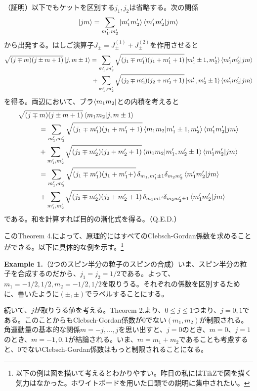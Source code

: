 \documentclass[dvipdfmx]{jarticle}
\theoremstyle{plain}
\begin{document}
\begin{enumerate}
        （証明）以下でもケットを区別する$j_1, j_2$は省略する。次の関係
        \begin{align}
          \ket{jm} = \sum_{m'_1,m'_2} \ket{m'_1m'_2}\bra{m'_1m'_2}\ket{jm}
        \end{align}
        から出発する。はしご演算子$J_\pm = J^{(1)}_\pm + J^{(2)}_\pm$を作用させると
        \begin{align}
          \sqrt{(j\mp m)(j\pm m+1)}\ket{j,m\pm 1} = \sum_{m'_1, m'_2}\sqrt{(j_1\mp m_1')(j_1 + m'_1 + 1)}\ket{m_1' \pm 1, m'_2}\bra{m'_1m'_2}\ket{jm} \\
          +\sum_{m'_1, m'_2}\sqrt{(j_2\mp m_2')(j_2 + m'_2 + 1)}\ket{m_1', m'_2\pm 1}\bra{m'_1m'_2}\ket{jm}
        \end{align}
        を得る。両辺において、ブラ$\bra{m_1m_2}$との内積を考えると
        \begin{align}
          &\sqrt{(j\mp m)(j\pm m+1)}\bra{m_1m_2}\ket{j,m\pm 1} \\
          &\quad \quad \quad = \sum_{m'_1, m'_2}\sqrt{(j_1\mp m_1')(j_1 + m'_1 + 1)}\bra{m_1m_2}\ket{m_1' \pm 1, m'_2}\bra{m'_1m'_2}\ket{jm} \\
          &\quad\quad\quad+\sum_{m'_1, m'_2}\sqrt{(j_2\mp m_2')(j_2 + m'_2 + 1)}\bra{m_1m_2}\ket{m_1', m'_2\pm 1}\bra{m'_1m'_2}\ket{jm} \\
          &\quad \quad \quad = \sum_{m'_1, m'_2}\sqrt{(j_1\mp m_1')(j_1 + m'_1 + )}\, \delta_{m_1,m_1'\pm1}\delta_{m_2m_2'}\bra{m'_1m'_2}\ket{jm} \\
          &\quad\quad\quad+\sum_{m'_1, m'_2}\sqrt{(j_2\mp m_2')(j_2 + m'_2 + 1)} \, \delta_{m_1m1'}\delta_{m_2m'_2\pm 1}\bra{m'_1m'_2}\ket{jm}
        \end{align}
        である。和を計算すれば目的の漸化式を得る。\hfill（Q.E.D.）

        このTheorem 4.によって、原理的にはすべてのClebsch-Gordan係数を求めることができる。以下に具体的な例を示す。\footnote{以下の例は図を描いて考えるとわかりやすい。昨日の私にはTikZで図を描く気力はなかった。ホワイトボードを用いた口頭での説明に集中されたい。}

        \textbf{Example 1.}（2つのスピン半分の粒子のスピンの合成）いま、スピン半分の粒子を合成するのだから、$j_1 = j_2 = 1/2$である。よって、$m_1 = -1/2, 1/2, m_2 = -1/2, 1/2$を取りうる。それぞれの係数を区別するために、書いたように$(\pm,\pm)$でラベルすることにする。

        続いて、$j$が取りうる値を考える。Theorem 2.より、$0\leq j \leq 1$つまり、$j = 0, 1$である。このことからもClebsch-Gordan係数が0でない$(m_1, m_2)$が制限される。角運動量の基本的な関係$m = -j, \dots ,j$を思い出すと、$j = 0$のとき、$m = 0$、$j = 1$のとき、$m = -1, 0, 1$が結論される。いま、$m = m_1 + m_2$であることも考慮すると、0でないClebsch-Gordan係数はもっと制限されることになる。


\end{enumerate}
\end{document}
